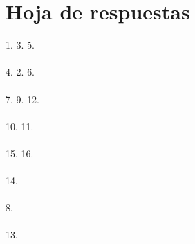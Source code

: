\documentclass{article}
\begin{document}
\section*{Hoja de respuestas}
1. \underline{\hspace{1cm}} \hspace{1cm}  3. \underline{\hspace{1cm}}  \hspace{1cm} 5. \underline{\hspace{1cm}} \\~\\ 4. \underline{\hspace{1cm}} \hspace{1cm} 2. \underline{\hspace{1cm}}  \hspace{1cm} 6. \underline{\hspace{1cm}} \\~\\ 7. \underline{\hspace{1cm}} \hspace{1cm} 9. \underline{\hspace{1cm}}  \hspace{1cm} 12. \underline{\hspace{1cm}} \\~\\ 10. \underline{\hspace{1cm}} \hspace{1cm} 11. \underline{\hspace{1cm}}  \\~\\ 15. \underline{\hspace{1cm}} \hspace{1cm} 16. \underline{\hspace{1cm}} \\~\\ 14. \underline{\hspace{1cm}}  \\~\\ 8. \underline{\hspace{1cm}} \\~\\ 13. \underline{\hspace{1cm}}
\end{document}
